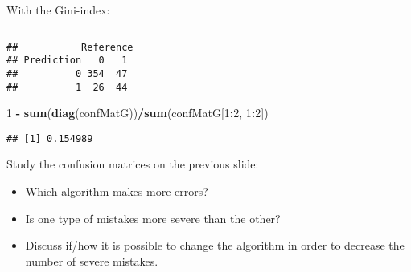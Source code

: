 \documentclass[10pt,ignorenonframetext,]{beamer}
\newenvironment{Shaded}{\begin{snugshade}}{\end{snugshade}}
\newcommand{\DataTypeTok}[1]{\textcolor[rgb]{0.13,0.29,0.53}{#1}}
\newcommand{\DecValTok}[1]{\textcolor[rgb]{0.00,0.00,0.81}{#1}}
\newcommand{\KeywordTok}[1]{\textcolor[rgb]{0.13,0.29,0.53}{\textbf{#1}}}
\newcommand{\NormalTok}[1]{#1}
\newcommand{\OperatorTok}[1]{\textcolor[rgb]{0.81,0.36,0.00}{\textbf{#1}}}
\newcommand{\StringTok}[1]{\textcolor[rgb]{0.31,0.60,0.02}{#1}}
\begin{document}
\begin{frame}[fragile]

\normalsize

With the Gini-index:

\(~\)

\tiny

\begin{Shaded}
\end{Shaded}

\begin{verbatim}
##           Reference
## Prediction   0   1
##          0 354  47
##          1  26  44
\end{verbatim}

\begin{Shaded}
\begin{Highlighting}[]
\DecValTok{1} \OperatorTok{-}\StringTok{ }\KeywordTok{sum}\NormalTok{(}\KeywordTok{diag}\NormalTok{(confMatG))}\OperatorTok{/}\KeywordTok{sum}\NormalTok{(confMatG[}\DecValTok{1}\OperatorTok{:}\DecValTok{2}\NormalTok{, }\DecValTok{1}\OperatorTok{:}\DecValTok{2}\NormalTok{])}
\end{Highlighting}
\end{Shaded}

\begin{verbatim}
## [1] 0.154989
\end{verbatim}

\end{frame}

\begin{frame}

Study the confusion matrices on the previous slide:

\begin{itemize}
\item
  Which algorithm makes more errors?
\item
  Is one type of mistakes more severe than the other?
\item
  Discuss if/how it is possible to change the algorithm in order to
  decrease the number of severe mistakes.
\end{itemize}

\end{frame}
\end{document}
